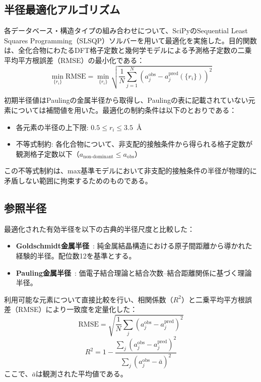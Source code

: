 \documentclass[a4paper,10pt,5p]{elsarticle}
\begin{document}
\subsection{半径最適化アルゴリズム}
各データベース・構造タイプの組み合わせについて、SciPyのSequential Least Squares Programming（SLSQP）ソルバーを用いて最適化を実施した。目的関数は、全化合物にわたるDFT格子定数と幾何学モデルによる予測格子定数の二乗平均平方根誤差（RMSE）の最小化である：
\begin{equation}
    \min_{\{r_i\}} \mathrm{RMSE} = \min_{\{r_i\}} \sqrt{\frac{1}{N}\sum_{j=1}^{N}\left(a_j^\mathrm{obs} - a_j^\mathrm{pred}(\{r_i\})\right)^2}
    \label{eq:objective}
\end{equation}

初期半径値はPaulingの金属半径から取得し、Paulingの表に記載されていない元素については補間値を用いた。最適化の制約条件は以下のとおりである：
\begin{itemize}
\setlength{\parskip}{0cm}
\setlength{\itemsep}{0cm}
    \item 各元素の半径の上下限: $0.5 \leq r_i \leq 3.5$~\AA
    \item 不等式制約: 各化合物について、非支配的接触条件から得られる格子定数が観測格子定数以下（$a_\mathrm{non\text{-}dominant} \leq a_\mathrm{obs}$）
\end{itemize}
この不等式制約は、max基準モデルにおいて非支配的接触条件の半径が物理的に矛盾しない範囲に拘束するためのものである。


\subsection{参照半径}
最適化された有効半径を以下の古典的半径尺度と比較した：
\begin{itemize}
\setlength{\parskip}{0cm}
\setlength{\itemsep}{0cm}
    \item \textbf{Goldschmidt金属半径}~\cite{goldschmidt1927}: 純金属結晶構造における原子間距離から導かれた経験的半径。配位数12を基準とする。
    \item \textbf{Pauling金属半径}~\cite{pauling1947}: 価電子結合理論と結合次数--結合距離関係に基づく理論半径。
\end{itemize}

利用可能な元素について直接比較を行い、相関係数（$R^2$）と二乗平均平方根誤差（RMSE）により一致度を定量化した：
\begin{equation}
\mathrm{RMSE} = \sqrt{\frac{1}{N} \sum_j \left(a_j^{\mathrm{obs}} - a_j^{\mathrm{pred}}\right)^2}
\label{eq:rmse}
\end{equation}
\begin{equation}
R^2 = 1 - \frac{\sum_j \left(a_j^{\mathrm{obs}} - a_j^{\mathrm{pred}}\right)^2}{\sum_j \left(a_j^{\mathrm{obs}} - \bar{a}\right)^2}
\label{eq:r2}
\end{equation}
ここで、$\bar{a}$は観測された平均値である。
\end{document}
